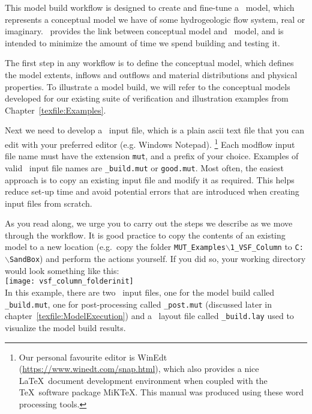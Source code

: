 \label{chapter:ModelBuild}
This model build workflow
is designed to create and fine-tune a \mfus\ model, which represents a conceptual model we have of some hydrogeologic flow system, real or imaginary. \mut\ provides the link between conceptual model and \mfus\ model, and is intended to minimize the amount of time we spend building and testing it.

The first step in any workflow is to define the conceptual model, which defines the model extents, inflows and outflows and material distributions and physical properties.  To illustrate a model build, we will refer to the conceptual models developed for our existing suite of verification and illustration examples from Chapter~\ref{texfile:Examples}.

Next we need to develop a \mut\ input file, which is a plain ascii text file that you can edit with your preferred editor (e.g. Windows Notepad). \footnote{Our personal favourite editor is WinEdt (\url{https://www.winedt.com/snap.html}), which also provides a nice \LaTeX\ document development environment when coupled with the \TeX\ software package MiKTeX.  This manual was produced using these word processing tools.}
Each modflow input file name must have the extension \texttt{mut}, and a prefix of your choice. Examples of valid \mut\ input file names are \texttt{\_build.mut} or \texttt{good.mut}. Most often, the easiest approach is to copy an existing input file and modify it as required.  This helps reduce set-up time and avoid potential errors that are introduced when creating input files from scratch.

As you read along, we urge you to carry out the steps we describe as we move through the workflow.  It is good practice to copy the contents of an existing model to a new location (e.g.\ copy the folder \texttt{MUT\_Examples$\backslash$1\_VSF\_Column} to \texttt{C:$\backslash$SandBox}) and perform the actions yourself.  If you did so, your working directory would look something like this:
    \vspace{.2in} \\
    \texttt{[image: vsf\_column\_folderinit]}
    \vspace{.2in} \\
In this example, there are two \mut\ input files, one for the model build called \texttt{\_build.mut}, one for post-processing called \texttt{\_post.mut} (discussed later in chapter~\ref{texfile:ModelExecution}) and a \tecplot\ layout file called \texttt{\_build.lay} used to visualize the model build results.

